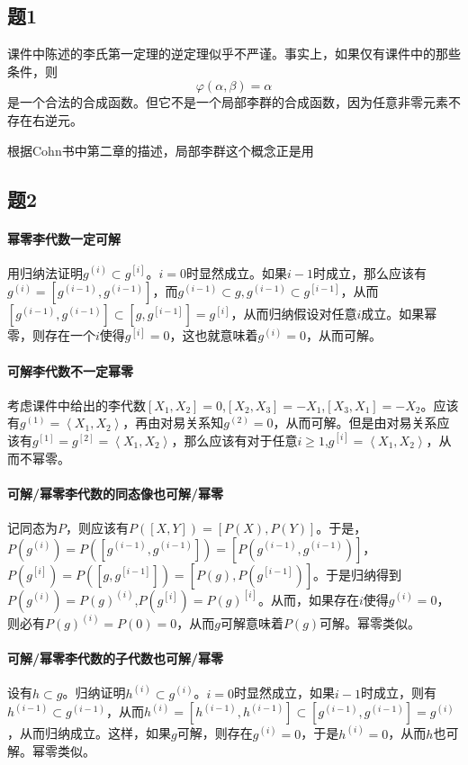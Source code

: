 \documentclass{ctexart}
\newcommand{\lspan}[1]{\left\langle #1 \right\rangle}
\begin{document}
	\subsection{题1}
	
	课件中陈述的李氏第一定理的逆定理似乎不严谨。事实上，如果仅有课件中的那些条件，则
	\begin{equation}
	\varphi(\alpha,\beta)=\alpha
	\end{equation}
	是一个合法的合成函数。但它不是一个局部李群的合成函数，因为任意非零元素不存在右逆元。
	
	根据Cohn书中第二章的描述，局部李群这个概念正是用
	
	\subsection{题2}
	
	\paragraph{幂零李代数一定可解} 用归纳法证明$g^{(i)}\subset g^{[i]}$。$i=0$时显然成立。如果$i-1$时成立，那么应该有$g^{(i)}=[g^{(i-1)},g^{(i-1)}]$，而$g^{(i-1)}\subset g,g^{(i-1)}\subset g^{[i-1]}$，从而$[g^{(i-1)},g^{(i-1)}]\subset[g,g^{[i-1]}]=g^{[i]}$，从而归纳假设对任意$i$成立。如果幂零，则存在一个$i$使得$g^{[i]}=0$，这也就意味着$g^{(i)}=0$，从而可解。
	
	\paragraph{可解李代数不一定幂零} 考虑课件中给出的李代数$[X_1,X_2]=0$,$[X_2,X_3]=-X_1$,$[X_3,X_1]=-X_2$。应该有$g^{(1)}=\lspan{X_1,X_2}$，再由对易关系知$g^{(2)}=0$，从而可解。但是由对易关系应该有$g^{[1]}=g^{[2]}=\lspan{X_1,X_2}$，那么应该有对于任意$i\geq 1$,$g^{[i]}=\lspan{X_1,X_2}$，从而不幂零。
	
	\paragraph{可解/幂零李代数的同态像也可解/幂零} 记同态为$P$，则应该有$P([X,Y])=[P(X),P(Y)]$。于是，$P(g^{(i)})=P([g^{(i-1)},g^{(i-1)}])=[P(g^{(i-1)},g^{(i-1)})]$，$P(g^{[i]})=P([g,g^{[i-1]}])=[P(g),P(g^{[i-1]})]$。于是归纳得到$P(g^{(i)})=P(g)^{(i)}$,$P(g^{[i]})=P(g)^{[i]}$。从而，如果存在$i$使得$g^{(i)}=0$，则必有$P(g)^{(i)}=P(0)=0$，从而$g$可解意味着$P(g)$可解。幂零类似。
	
	\paragraph{可解/幂零李代数的子代数也可解/幂零} 设有$h\subset g$。归纳证明$h^{(i)}\subset g^{(i)}$。$i=0$时显然成立，如果$i-1$时成立，则有$h^{(i-1)}\subset g^{(i-1)}$，从而$h^{(i)}=[h^{(i-1)},h^{(i-1)}]\subset [g^{(i-1)},g^{(i-1)}]=g^{(i)}$，从而归纳成立。这样，如果$g$可解，则存在$g^{(i)}=0$，于是$h^{(i)}=0$，从而$h$也可解。幂零类似。
	
\end{document}
